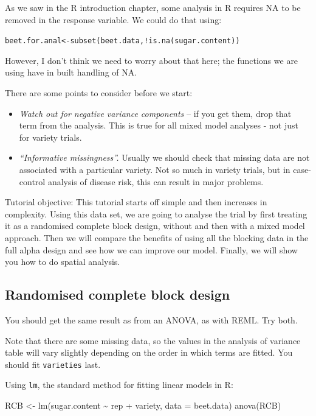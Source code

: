\documentclass[
]{book}
\makeatletter
\newenvironment{Shaded}{\begin{snugshade}}{\end{snugshade}}
\newcommand{\AttributeTok}[1]{\textcolor[rgb]{0.77,0.63,0.00}{#1}}
\newcommand{\FunctionTok}[1]{\textcolor[rgb]{0.00,0.00,0.00}{#1}}
\newcommand{\NormalTok}[1]{#1}
\newcommand{\OtherTok}[1]{\textcolor[rgb]{0.56,0.35,0.01}{#1}}
\newcommand{\SpecialCharTok}[1]{\textcolor[rgb]{0.00,0.00,0.00}{#1}}
\newenvironment{kframe}{%
\medskip{}
\setlength{\fboxsep}{.8em}
 \def\at@end@of@kframe{}%
 \ifinner\ifhmode%
  \def\at@end@of@kframe{\end{minipage}}%
  \begin{minipage}{\columnwidth}%
 \fi\fi%
 \def\FrameCommand##1{\hskip\@totalleftmargin \hskip-\fboxsep
 \colorbox{shadecolor}{##1}\hskip-\fboxsep
     \hskip-\linewidth \hskip-\@totalleftmargin \hskip\columnwidth}%
 \MakeFramed {\advance\hsize-\width
   \@totalleftmargin\z@ \linewidth\hsize
   \@setminipage}}%
 {\par\unskip\endMakeFramed%
 \at@end@of@kframe}
\newenvironment{rmdblock}[1]
  {
  \begin{itemize}
  \renewcommand{\labelitemi}{
    \raisebox{-.7\height}[0pt][0pt]{
      {\setkeys{Gin}{width=3em,keepaspectratio}\texttt{[image: images/\#1]}}
    }
  }
  \setlength{\fboxsep}{1em}
  \begin{kframe}
  \item
  }
  {
  \end{kframe}
  \end{itemize}
  }
\newenvironment{rmdnote}
  {\begin{rmdblock}{note}}
  {\end{rmdblock}}
\makeatother
\begin{document}
As we saw in the R introduction chapter, some analysis in R requires NA to be removed in the response variable. We could do that using:

\texttt{beet.for.anal\textless{}-subset(beet.data,!is.na(sugar.content))}

However, I don't think we need to worry about that here; the functions we are using have in built handling of NA.

There are some points to consider before we start:

\begin{itemize}
\item
  \emph{Watch out for negative variance components} -- if you get them, drop that term from the analysis. This is true for all mixed model analyses - not just for variety trials.
\item
  \emph{``Informative missingness''.} Usually we should check that missing data are not associated with a particular variety. Not so much in variety trials, but in case-control analysis of disease risk, this can result in major problems.
\end{itemize}

\begin{rmdnote}
Tutorial objective: This tutorial starts off simple and then increases in complexity. Using this data set, we are going to analyse the trial by first treating it as a randomised complete block design, without and then with a mixed model approach. Then we will compare the benefits of using all the blocking data in the full alpha design and see how we can improve our model. Finally, we will show you how to do spatial analysis.
\end{rmdnote}

\hypertarget{randomised-complete-block-design}{%
\subsection{Randomised complete block design}\label{randomised-complete-block-design}}

You should get the same result as from an ANOVA, as with REML. Try both.

Note that there are some missing data, so the values in the analysis of variance table will vary slightly depending on the order in which terms are fitted. You should fit \texttt{varieties} last.

Using \texttt{lm}, the standard method for fitting linear models in R:

\begin{Shaded}
\begin{Highlighting}[]
\NormalTok{RCB }\OtherTok{\textless{}{-}} \FunctionTok{lm}\NormalTok{(sugar.content }\SpecialCharTok{\textasciitilde{}}\NormalTok{ rep }\SpecialCharTok{+}\NormalTok{ variety, }\AttributeTok{data =}\NormalTok{ beet.data)}
\FunctionTok{anova}\NormalTok{(RCB)}
\end{Highlighting}
\end{Shaded}
\end{document}
